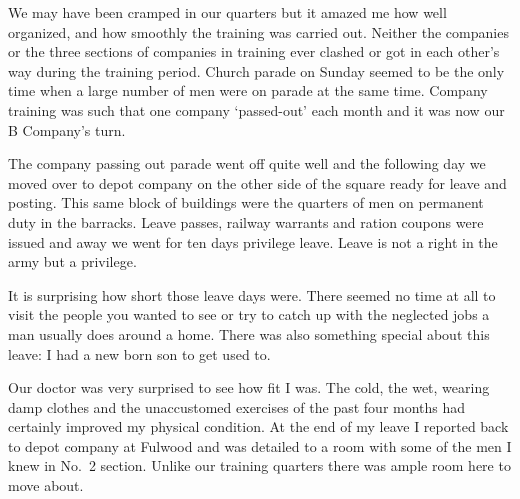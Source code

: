 We may have been cramped in our quarters but it amazed me how well
organized, and how smoothly the training was carried out. Neither the
companies or the three sections of companies in training ever clashed
or got in each other's way during the training period. Church parade
on Sunday seemed to be the only time when a large number of men were
on parade at the same time. Company training was such that one
company `passed-out' each month and it was now our B Company's turn.


The company passing out parade went off quite well and the following
day we moved over to depot company on the other side of the square
ready for leave and posting. This same block of buildings were the
quarters of men on permanent duty in the barracks. Leave passes,
railway warrants and ration coupons were issued and away we went for
ten days privilege leave. Leave is not a right in the army but a
privilege. 

It is surprising how short those leave days were. There seemed no
time at all to visit the people you wanted to see or try to catch up
with the neglected jobs a man usually does around a home. There was
also something special about this leave: I had a new born son to get
used to. 

Our doctor was very surprised to see how fit I was. The cold, the
wet, wearing damp clothes and the unaccustomed exercises of the past
four months had certainly improved my physical condition. At the end
of my leave I reported back to depot company at Fulwood and was
detailed to a room with some of the men I knew in No.~2 section.
Unlike our training quarters there was ample room here to move about.
 
